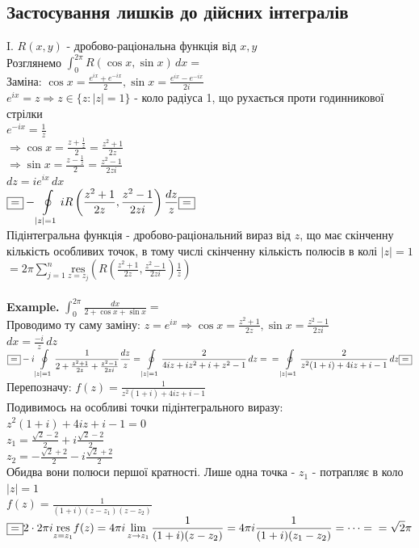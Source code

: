 \documentclass[a4paper, 14pt]{extarticle}
\def\residue#1#2{\underset{z = {#1}}{\textrm{res}} {#2}}
\def\hugespace{\vspace{5mm} \\}
\begin{document}
\subsection{Застосування лишків до дійсних інтегралів}
I. $R(x,y)$ - дробово-раціональна функція від $x,y$\\
Розглянемо $\displaystyle \int_{0}^{2\pi} R(\cos x, \sin x) \,dx \boxed{=}$\\
Заміна: $\displaystyle \cos x = \frac{e^{ix}+e^{-ix}}{2}, \sin x = \frac{e^{ix}-e^{-ix}}{2i}$\\
$\displaystyle e^{ix} = z \Rightarrow z \in \{z: |z| = 1\}$ - коло радіуса 1, що рухається проти годинникової стрілки\\
$\displaystyle e^{-ix} = \frac{1}{z}$\\
$\Rightarrow \displaystyle \cos x = \frac{z+\frac{1}{z}}{2} = \frac{z^2+1}{2z}$\\
$\Rightarrow \displaystyle \sin x = \frac{z-\frac{1}{z}}{2} = \frac{z^2-1}{2zi}$\\
$dz = i e^{ix}\,dx$\\
$\displaystyle \boxed{=} -\oint\displaylimits_{|z|=1} iR\left(\frac{z^2+1}{2z}, \frac{z^2-1}{2zi}\right) \frac{dz}{z} \boxed{=}$\\
Підінтегральна функція - дробово-раціональний вираз від $z$, що має скінченну кількість особливих точок, в тому числі скінченну кількість полюсів в колі $|z|=1$\\
$\displaystyle \boxed{=} 2 \pi \sum_{j=1}^n \residue{z_j}{\left(R\left(\frac{z^2+1}{2z}, \frac{z^2-1}{2zi}\right) \frac{1}{z}\right)}$\\
\hugespace
\textbf{Example.} $\displaystyle \int_{0}^{2\pi} \frac{dx}{2 + \cos x + \sin x} \boxed{=}$\\
Проводимо ту саму заміну:  $\displaystyle z = e^{ix} \Rightarrow \cos x = \frac{z^2+1}{2z}, \sin x = \frac{z^2-1}{2zi}$\\
$\displaystyle dx = \frac{-i}{z} \,dz$\\
$\displaystyle \boxed{=} -i\oint\displaylimits_{|z|=1} \frac{1}{2+ \frac{z^2+1}{2z} + \frac{z^2-1}{2zi}} \frac{dz}{z} = \oint\displaylimits_{|z|=1} \frac{2}{4iz + iz^2 + i + z^2 - 1} \,dz = \\ = \oint\displaylimits_{|z|=1} \frac{2}{z^2(1+i) + 4iz + i-1} \,dz \boxed{=}$\\
Перепозначу: $\displaystyle f(z) = \frac{1}{z^2(1+i)+4iz+i-1}$\\
Подивимось на особливі точки підінтегрального виразу:\\
$z^2(1+i)+4iz+i-1=0$\\
$z_1 = \displaystyle \frac{\sqrt{2}-2}{2} + i \frac{\sqrt{2}-2}{2}$\\
$z_2 = \displaystyle -\frac{\sqrt{2}+2}{2} - i \frac{\sqrt{2}+2}{2}$\\
Обидва вони полюси першої кратності. Лише одна точка - $z_1$ - потрапляє в коло $|z| =1$\\
$\displaystyle f(z) = \frac{1}{(1+i)(z-z_1)(z-z_2)}$\\
$\displaystyle \boxed{=} 2 \cdot 2\pi i \residue{z_1}{f(z)} = 4 \pi i \lim_{z \to z_1} \frac{1}{(1+i)(z-z_2)} = 4 \pi i \frac{1}{(1+i)(z_1 - z_2)} = \dots = \\ = \sqrt{2} \pi$
\hugespace
\end{document}
